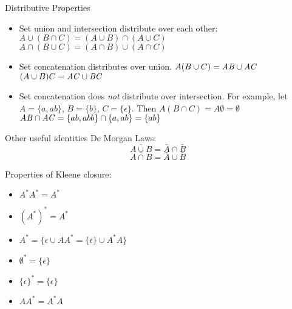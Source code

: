 \documentclass[style=sailor,size=12pt]{powerdot}
\begin{document}
\begin{slide}[bm=,toc=]{Distributive Properties}
\begin{itemize}
   \item  Set union and intersection distribute over each other:
   $A \cup (B \cap C) = (A\cup B)\cap(A \cup C)$\\
   $A \cap (B \cup C) = (A\cap B)\cup(A \cap C)$

   \item Set concatenation distributes over union. 
    $A(B\cup C) = \mathit{AB} \cup \mathit{AC}$\\
    $(A\cup B)C = \mathit{AC} \cup \mathit{BC}$
    \item Set concatenation does \emph{not} distribute over intersection. For
    example, let $A = \{a,ab\}$, $B = \{b\}$, $C = \{\epsilon\}$. Then
       $A(B\cap C) = A\emptyset = \emptyset$ \\
       $\mathit{AB} \cap \mathit{AC} = \{ab,abb\} \cap \{a,ab\} = \{ab\}$
\end{itemize}
\end{slide}

\begin{slide}[bm=,toc=]{Other useful identities}
De Morgan Laws:
\[
\overline{A \cup B} = \bar{A} \cap \bar{B}  
\]
\[
\overline{A \cap B} = \bar{A} \cup \bar{B}  
\]

Properties of Kleene closure:
\begin{itemize}
\item $A^*A^* = A^*$
\item $(A^*)^* = A^*$
\item $A^* = \{\epsilon \cup AA^* = \{\epsilon\}\cup A^*A \}$
\item $\emptyset^* = \{\epsilon\}$ 
\item $\{\epsilon\}^* = \{\epsilon\}$ 
\item $AA^* = A^*A$ 
\end{itemize}
\end{slide}
\end{document}
